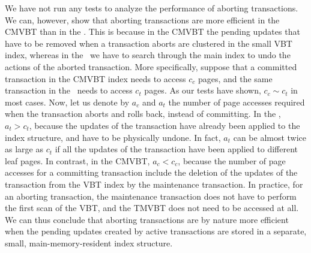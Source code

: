 We have not run any tests to analyze the performance of aborting
transactions. 
We can, however, show that aborting transactions are more
efficient in the CMVBT than in the \TSBtree.
This is because in the CMVBT the pending updates that have to be removed
when a transaction aborts are clustered in the small VBT index, whereas in
the \TSBtree\ we have to search through the main index to undo the actions of
the aborted transaction. 
More specifically, suppose that a committed transaction in the CMVBT
index needs to access $c_c$ pages, and the same transaction in the \TSBtree\
needs to access $c_t$ pages.
As our tests have shown, $c_c \sim c_t$ in most cases.
Now, let us denote by $a_c$ and $a_t$ the number of page accesses
required when the transaction aborts and rolls back, instead of
committing. 
In the \TSBtree, $a_t > c_t$, because the updates of the transaction have
already been applied to the index structure, and have to be
physically undone.
In fact, $a_t$ can be almost twice as large as $c_t$ if all the
updates of the transaction have been applied to different leaf pages.
In contrast, in the CMVBT, $a_c < c_c$, because the number of page
accesses for a committing transaction include the deletion of the
updates of the transaction from the VBT index by the maintenance
transaction. 
In practice, for an aborting transaction, the maintenance transaction 
does not have to perform the first scan of the VBT, and the TMVBT does
not need to be accessed at all.
We can thus conclude that aborting transactions are by nature more efficient
when the pending updates created by active transactions are stored in a
separate, small, main-memory-resident index structure.

